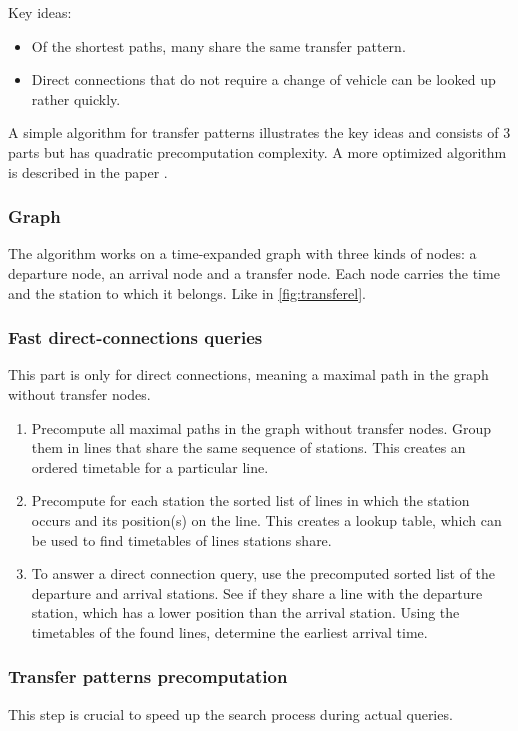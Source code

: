 Key ideas:
\begin{itemize}
    \item Of the shortest paths, many share the same transfer pattern.
    \item Direct connections that do not require a change of vehicle can be looked up rather quickly. 
\end{itemize}
A simple algorithm for transfer patterns illustrates the key ideas and consists of 3 parts but has quadratic precomputation complexity. A more optimized algorithm is described in the paper \cite{bast_fast_2010}.
\subsubsection{Graph}
The algorithm works on a time-expanded graph with three kinds of nodes: a departure node, an arrival node and a transfer node. Each node carries the time and the station to which it belongs. Like in \autoref{fig:transferel}.

\subsubsection{Fast direct-connections queries}
This part is only for direct connections, meaning a maximal path in the graph without transfer nodes.

\begin{enumerate}
    \item Precompute all maximal paths in the graph without transfer nodes. Group them in lines that share the same sequence of stations. This creates an ordered timetable for a particular line.
    \item Precompute for each station the sorted list of lines in which the station occurs and its position(s) on the line. This creates a lookup table, which can be used to find timetables of lines stations share.
    \item To answer a direct connection query, use the precomputed sorted list of the departure and arrival stations. See if they share a line with the departure station, which has a lower position than the arrival station. Using the timetables of the found lines, determine the earliest arrival time.
\end{enumerate}
\subsubsection{Transfer patterns precomputation}
This step is crucial to speed up the search process during actual queries. 

